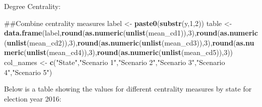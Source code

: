 \documentclass[]{article}
\newenvironment{Shaded}{\begin{snugshade}}{\end{snugshade}}
\newcommand{\KeywordTok}[1]{\textcolor[rgb]{0.13,0.29,0.53}{\textbf{#1}}}
\newcommand{\DataTypeTok}[1]{\textcolor[rgb]{0.13,0.29,0.53}{#1}}
\newcommand{\DecValTok}[1]{\textcolor[rgb]{0.00,0.00,0.81}{#1}}
\newcommand{\StringTok}[1]{\textcolor[rgb]{0.31,0.60,0.02}{#1}}
\newcommand{\OtherTok}[1]{\textcolor[rgb]{0.56,0.35,0.01}{#1}}
\newcommand{\OperatorTok}[1]{\textcolor[rgb]{0.81,0.36,0.00}{\textbf{#1}}}
\newcommand{\NormalTok}[1]{#1}
\begin{document}
Degree Centrality:

\begin{Shaded}
\begin{Highlighting}[]
\NormalTok{##Combine centrality measures}
\NormalTok{label <-}\StringTok{ }\KeywordTok{paste0}\NormalTok{(}\KeywordTok{substr}\NormalTok{(y,}\DecValTok{1}\NormalTok{,}\DecValTok{2}\NormalTok{))}
\NormalTok{table <-}\StringTok{ }\KeywordTok{data.frame}\NormalTok{(label,}\KeywordTok{round}\NormalTok{(}\KeywordTok{as.numeric}\NormalTok{(}\KeywordTok{unlist}\NormalTok{(mean_cd1)),}\DecValTok{3}\NormalTok{),}\KeywordTok{round}\NormalTok{(}\KeywordTok{as.numeric}\NormalTok{(}\KeywordTok{unlist}\NormalTok{(mean_cd2)),}\DecValTok{3}\NormalTok{),}\KeywordTok{round}\NormalTok{(}\KeywordTok{as.numeric}\NormalTok{(}\KeywordTok{unlist}\NormalTok{(mean_cd3)),}\DecValTok{3}\NormalTok{),}\KeywordTok{round}\NormalTok{(}\KeywordTok{as.numeric}\NormalTok{(}\KeywordTok{unlist}\NormalTok{(mean_cd4)),}\DecValTok{3}\NormalTok{),}\KeywordTok{round}\NormalTok{(}\KeywordTok{as.numeric}\NormalTok{(}\KeywordTok{unlist}\NormalTok{(mean_cd5)),}\DecValTok{3}\NormalTok{))}
\NormalTok{col_names <-}\StringTok{ }\KeywordTok{c}\NormalTok{(}\StringTok{"State"}\NormalTok{,}\StringTok{"Scenario 1"}\NormalTok{,}\StringTok{"Scenario 2"}\NormalTok{,}\StringTok{"Scenario 3"}\NormalTok{,}\StringTok{"Scenario 4"}\NormalTok{,}\StringTok{"Scenario 5"}\NormalTok{)}
\end{Highlighting}
\end{Shaded}

Below is a table showing the values for different centrality measures by
state for election year 2016:

\begin{Shaded}
\end{Shaded}
\end{document}
